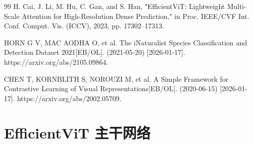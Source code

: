 \documentclass[12pt]{ctexart}
\begin{document}
\begin{thebibliography}{99}
 H. Cai, J. Li, M. Hu, C. Gan, and S. Han, "EfficientViT: Lightweight Multi-Scale Attention for High-Resolution Dense Prediction," in Proc. IEEE/CVF Int. Conf. Comput. Vis. (ICCV), 2023, pp. 17302–17313.

 HORN G V, MAC AODHA O, et al. The iNaturalist Species Classification and Detection Dataset 2021[EB/OL]. (2021-05-20) [2026-01-17]. https://arxiv.org/abs/2105.09864.

 CHEN T, KORNBLITH S, NOROUZI M, et al. A Simple Framework for Contrastive Learning of Visual Representations[EB/OL]. (2020-06-15) [2026-01-17]. https://arxiv.org/abs/2002.05709.

\end{thebibliography}

\appendix
\section{EfficientViT 主干网络}
\lstset{language=python}
\end{document}
